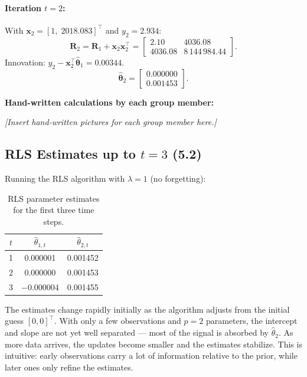 \documentclass[11pt,a4paper]{article}
\begin{document}
\paragraph{Iteration $t=2$:}
With $\boldsymbol{x}_2 = [1,\;2018.083]^\top$ and $y_2 = 2.934$:
\[
  \boldsymbol{R}_2 = \boldsymbol{R}_1 + \boldsymbol{x}_2\boldsymbol{x}_2^\top
  = \begin{bmatrix} 2.10 & 4036.08 \\ 4036.08 & 8\,144\,984.44 \end{bmatrix}.
\]
Innovation: $y_2 - \boldsymbol{x}_2^\top\hat{\boldsymbol{\theta}}_1 = 0.00344$.
\[
  \hat{\boldsymbol{\theta}}_2 = \begin{bmatrix} 0.000000 \\ 0.001453 \end{bmatrix}.
\]

\textbf{Hand-written calculations by each group member:}

\textit{[Insert hand-written pictures for each group member here.]}

\subsection{RLS Estimates up to $t=3$ (5.2)}

Running the RLS algorithm with $\lambda=1$ (no forgetting):

\begin{table}[H]
\centering
\begin{tabular}{ccc}
\toprule
$t$ & $\hat\theta_{1,t}$ & $\hat\theta_{2,t}$ \\
\midrule
1 & 0.000001 & 0.001452 \\
2 & 0.000000 & 0.001453 \\
3 & $-0.000004$ & 0.001455 \\
\bottomrule
\end{tabular}
\caption{RLS parameter estimates for the first three time steps.}
\end{table}

The estimates change rapidly initially as the algorithm adjusts from the initial guess $[0,0]^\top$.  With only a few observations and $p=2$ parameters, the intercept and slope are not yet well separated --- most of the signal is absorbed by $\hat\theta_2$.  As more data arrives, the updates become smaller and the estimates stabilize.  This is intuitive: early observations carry a lot of information relative to the prior, while later ones only refine the estimates.
\end{document}
